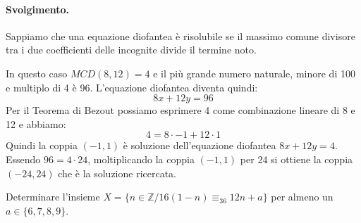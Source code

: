 \paragraph{Svolgimento.} Sappiamo che una equazione diofantea è risolubile se il massimo comune divisore tra i due coefficienti delle incognite divide il termine noto.

In questo caso $MCD(8,12)=4$ e il più grande numero naturale, minore di 100 e multiplo di 4 è 96. L'equazione diofantea diventa quindi:
\[8x+12y=96\]
Per il Teorema di Bezout possiamo esprimere 4 come combinazione lineare di 8 e 12 e abbiamo:
\[4 = 8 \cdot -1 + 12 \cdot 1\]
Quindi la coppia $(-1,1)$ è soluzione dell'equazione diofantea $8x+12y=4$. Essendo $96= 4 \cdot 24$, moltiplicando la coppia $(-1,1)$ per 24 si ottiene la coppia $(-24,24)$ che è la soluzione ricercata. \hfill \blacksquare

\begin{exsbox}
	Determinare l'insieme $X=\{n \in \mathbb{Z} / 16(1-n) \equiv_{36} 12n+a\}$ per almeno un $a \in \{6,7,8,9\}$.
\end{exsbox}
